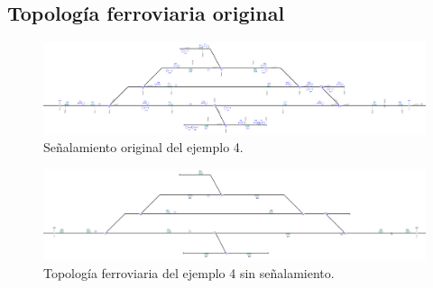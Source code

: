 \subsection{Topología ferroviaria original}

\lipsum[2]


\begin{figure}[H]
	\centering
	\includegraphics[width=1\textwidth]{resultados-obtenidos/ejemplo4/images/4_original.png}
	\centering\caption{Señalamiento original del ejemplo 4.}
\end{figure}

\lipsum[2]

\begin{figure}[H]
	\centering
	\includegraphics[width=1\textwidth]{resultados-obtenidos/ejemplo4/images/4_empty.png}
	\centering\caption{Topología ferroviaria del ejemplo 4 sin señalamiento.}
\end{figure}

\lipsum[2]
